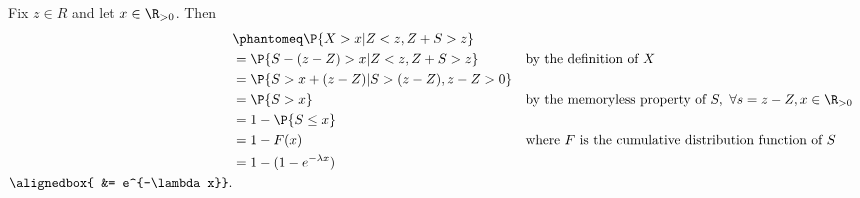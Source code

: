 \documentclass[
  coursecode={MTHE 455},
  assignmentname={Assignment \assignmentnumber},
  studentnumber=20053722,
  name={Bryan Hoang},
  draft,
]{
  ltxanswer%
}
\begin{document}
\begin{questions}
\begin{parts}
      \part{}
      \begin{solution}
        Fix \(z \in R\) and let \(x \in \R_{>0}\). Then
        \begin{align*}
                       &\phantomeq\P{X > x | Z < z, Z + S > z}                                                                                          \\
                       &= \P{S - (z - Z) > x | Z < z, Z + S > z}       & &\text{by the definition of \(X\)}                                             \\
                       &= \P{S > x + (z - Z) | S > (z - Z), z - Z > 0}                                                                                  \\
                       &= \P{S > x }                                   & &\text{by the memoryless property of \(S,\ \forall s = z - Z, x \in \R_{>0}\)} \\
                       &= 1 - \P{S \le x }                                                                                                              \\
                       &= 1 - F(x)                                     & &\text{where \(F\) is the cumulative distribution function of \(S\)}           \\
                       &= 1 - (1 - e^{-\lambda x})                                                                                                      \\
          \alignedbox{ &= e^{-\lambda x}}.
        \end{align*}
      \end{solution}
    \end{parts}
  \end{questions}
\end{document}
